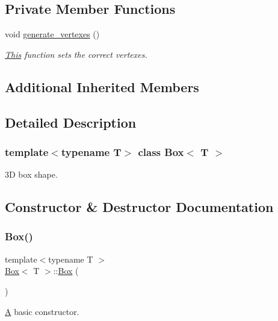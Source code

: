 \subsection*{Private Member Functions}
\begin{DoxyCompactItemize}
\item 
void \mbox{\hyperlink{classBox_a7f7b061bf913f9ab47bff75536bc137d}{generate\+\_\+vertexes}} ()
\begin{DoxyCompactList}\small\item\em \mbox{\hyperlink{classThis}{This}} function sets the correct vertexes. \end{DoxyCompactList}\end{DoxyCompactItemize}
\subsection*{Additional Inherited Members}


\subsection{Detailed Description}
\subsubsection*{template$<$typename T$>$\newline
class Box$<$ T $>$}

3D box shape. 

\subsection{Constructor \& Destructor Documentation}
\mbox{\label{classBox_a057f84d8fa68647c6484d4e004d8ab74}} 
\subsubsection{\texorpdfstring{Box()}{Box()}\hspace{0.1cm}{\footnotesize\ttfamily [1/3]}}
{\footnotesize\ttfamily template$<$typename T $>$ \\
\mbox{\hyperlink{classBox}{Box}}$<$ T $>$\+::\mbox{\hyperlink{classBox}{Box}} (\begin{DoxyParamCaption}{ }\end{DoxyParamCaption})}



\mbox{\hyperlink{classA}{A}} basic constructor. 

